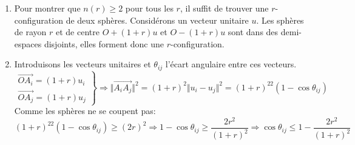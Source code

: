 \begin{enumerate}
 \item Pour montrer que $n(r)\geq2$ pour tous les $r$, il suffit de trouver une $r$-configuration de deux sphères. Considérons un vecteur unitaire $u$. Les sphères de rayon $r$ et de centre $O+(1+r)u$ et $O-(1+r)u$ sont dans des demi-espaces disjoints, elles forment donc une $r$-configuration.
 \item Introduisons les vecteurs unitaires et $\theta_{ij}$ l'écart angulaire entre ces vecteurs.
\begin{displaymath}
 \left. 
\begin{aligned}
\overrightarrow{OA_i} = (1+r)u_i \\
\overrightarrow{OA_j} = (1+r)u_j 
\end{aligned}\right\rbrace 
\Rightarrow
\Vert \overrightarrow{A_iA_j}\Vert^2 = (1+r)^2\Vert u_i - u_j\Vert^2
= (1+r)^22(1-\cos \theta_{ij})
\end{displaymath}
Comme les sphères ne se coupent pas:
\begin{displaymath}
 (1+r)^22(1-\cos \theta_{ij})\geq (2r)^2 \Rightarrow
1-\cos \theta_{ij} \geq \frac{2r^2}{(1+r)^2} \Rightarrow
\cos \theta_{ij} \leq 1-\frac{2r^2}{(1+r)^2}
\end{displaymath}


\end{enumerate}

